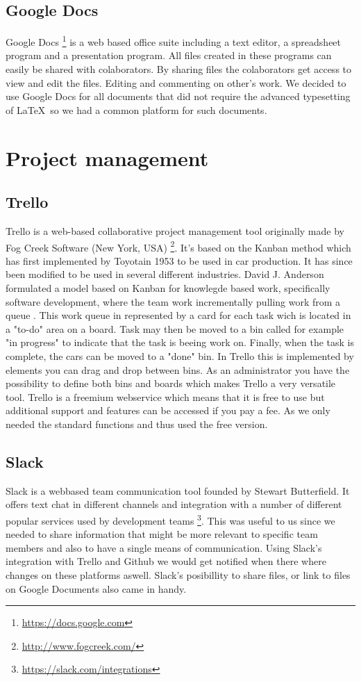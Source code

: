 \documentclass[11pt,a4paper,titlepage,oneside]{report}
\begin{document}
  \subsection{Google Docs}
  Google Docs \footnote{\url{https://docs.google.com}} is a web based office suite including a text editor, a spreadsheet program and a presentation program. All files created in these programs can easily be shared with colaborators. By sharing files the colaborators get access to view and edit the files. Editing and commenting on other's work. We decided to use Google Docs for all documents that did not require the advanced typesetting of \LaTeX~so we had a common platform for such documents.

\section{Project management}
  \subsection{Trello}
Trello is a web-based collaborative project management tool originally made by Fog Creek Software (New York, USA) \footnote{\url{http://www.fogcreek.com/}}. 
It's based on the Kanban method which has first implemented by Toyotain 1953 to be used in car production. It has since been modified to be used in several different industries. 
David J. Anderson formulated a model based on Kanban for knowlegde based work, specifically software development, where the team work incrementally pulling work from a queue \cite{da2004}. 
This work queue in represented by a card for each task wich is located in a "to-do" area on a board. Task may then be moved to a bin called for example "in progress" to indicate that the task is beeing work on. Finally, when the task is complete, the cars can be moved to a "done" bin. In Trello this is implemented by elements you can drag and drop between bins. As an administrator you have the possibility to define both bins and boards which makes Trello a very versatile tool.  
Trello is a freemium webservice which means that it is free to use but additional support and features can be accessed if you pay a fee. As we only needed the standard functions and thus used the free version.
  \subsection{Slack}
Slack is a webbased team communication tool founded by Stewart Butterfield. It offers text chat in different channels and integration with a number of different popular services used by development teams \footnote{\url{https://slack.com/integrations}}. This was useful to us since we needed to share information that might be more relevant to specific team members and also to have a single means of communication. Using Slack's integration with Trello and Github we would get notified when there where changes on these platforms aswell. Slack's posibillity to share files, or link to files on Google Documents also came in handy.
\end{document}
